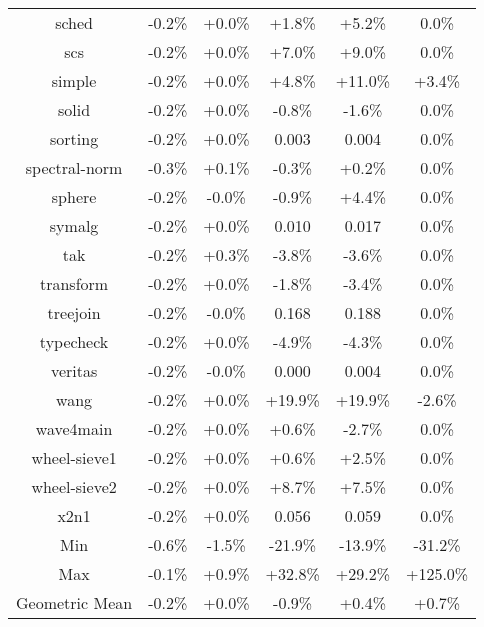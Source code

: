 \begin{tabular}{ c c c c c c }
sched & -0.2\% & +0.0\% & +1.8\% & +5.2\% &  0.0\%\\
scs & -0.2\% & +0.0\% & +7.0\% & +9.0\% &  0.0\%\\
simple & -0.2\% & +0.0\% & +4.8\% & +11.0\% & +3.4\%\\
solid & -0.2\% & +0.0\% & -0.8\% & -1.6\% &  0.0\%\\
sorting & -0.2\% & +0.0\% & 0.003 & 0.004 &  0.0\%\\
spectral-norm & -0.3\% & +0.1\% & -0.3\% & +0.2\% &  0.0\%\\
sphere & -0.2\% & -0.0\% & -0.9\% & +4.4\% &  0.0\%\\
symalg & -0.2\% & +0.0\% & 0.010 & 0.017 &  0.0\%\\
tak & -0.2\% & +0.3\% & -3.8\% & -3.6\% &  0.0\%\\
transform & -0.2\% & +0.0\% & -1.8\% & -3.4\% &  0.0\%\\
treejoin & -0.2\% & -0.0\% & 0.168 & 0.188 &  0.0\%\\
typecheck & -0.2\% & +0.0\% & -4.9\% & -4.3\% &  0.0\%\\
veritas & -0.2\% & -0.0\% & 0.000 & 0.004 &  0.0\%\\
wang & -0.2\% & +0.0\% & +19.9\% & +19.9\% & -2.6\%\\
wave4main & -0.2\% & +0.0\% & +0.6\% & -2.7\% &  0.0\%\\
wheel-sieve1 & -0.2\% & +0.0\% & +0.6\% & +2.5\% &  0.0\%\\
wheel-sieve2 & -0.2\% & +0.0\% & +8.7\% & +7.5\% &  0.0\%\\
x2n1 & -0.2\% & +0.0\% & 0.056 & 0.059 &  0.0\%\\
\hline
Min & -0.6\% & -1.5\% & -21.9\% & -13.9\% & -31.2\%\\
Max & -0.1\% & +0.9\% & +32.8\% & +29.2\% & +125.0\%\\
Geometric Mean & -0.2\% & +0.0\% & -0.9\% & +0.4\% & +0.7\%\\


\end{tabular}

